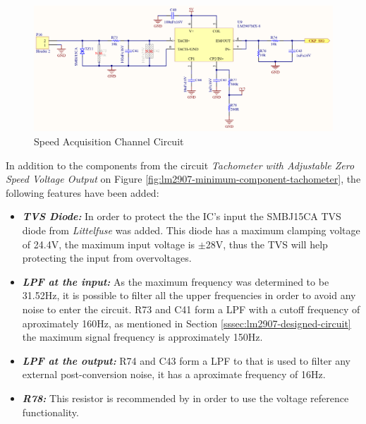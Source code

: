 			\begin{figure}[htbp]
				\centering
				\includegraphics[width=1\textwidth]{figuras/fig-ckp-conditioning-circuit.png}
				\caption{Speed Acquisition Channel Circuit}
				\label{fig:ckp-conditioning-circuit}
			\end{figure}

			In addition to the components from the circuit \textit{Tachometer with Adjustable Zero Speed Voltage Output} on Figure \ref{fig:lm2907-minimum-component-tachometer}, the following features have been added:

			\begin{itemize}
				\item\textit{\textbf{TVS Diode:}} In order to protect the the IC's input the SMBJ15CA TVS diode from \textit{Littelfuse} was added. This diode has a maximum clamping voltage of 24.4V, the maximum input voltage is $\pm$28V, thus the TVS will help protecting the input from overvoltages.\label{itm:ckp-circuit-tvs}
				\item\textit{\textbf{LPF at the input:}} As the maximum frequency was determined to be 31.52Hz, it is possible to filter all the upper frequencies in order to avoid any noise to enter the circuit. R73 and C41 form a LPF with a cutoff frequency of aproximately 160Hz, as mentioned in Section \ref{sssec:lm2907-designed-circuit} the maximum signal frequency is approximately 150Hz.
				\item\textit{\textbf{LPF at the output:}} R74 and C43 form a LPF to that is used to filter any external post-conversion noise, it has a aproximate frequency of 16Hz.\label{itm:ckp-circuit-lpf-output} 
				\item\textit{\textbf{R78:}} This resistor is recommended by \cite{lm2907-datasheet} in order to use the voltage reference functionality.
			\end{itemize}

